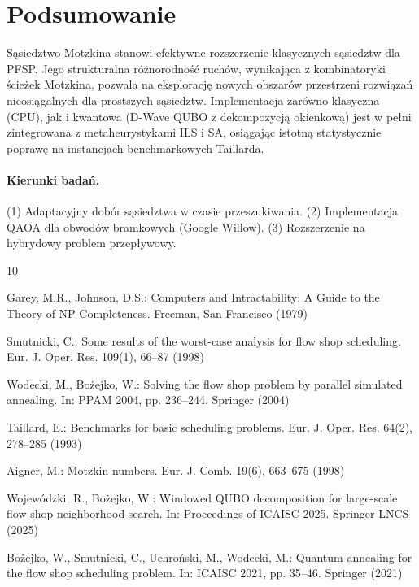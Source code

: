 \documentclass[12pt,a4paper]{article}
\begin{document}
\section{Podsumowanie}

Sąsiedztwo Motzkina stanowi efektywne rozszerzenie klasycznych sąsiedztw dla PFSP. Jego strukturalna różnorodność ruchów, wynikająca z kombinatoryki ścieżek Motzkina, pozwala na eksplorację nowych obszarów przestrzeni rozwiązań nieosiągalnych dla prostszych sąsiedztw. Implementacja zarówno klasyczna (CPU), jak i kwantowa (D-Wave QUBO z dekompozycją okienkową) jest w pełni zintegrowana z metaheurystykami ILS i SA, osiągając istotną statystycznie poprawę na instancjach benchmarkowych Taillarda.

\paragraph{Kierunki badań.}
(1) Adaptacyjny dobór sąsiedztwa w czasie przeszukiwania. (2) Implementacja QAOA dla obwodów bramkowych (Google Willow). (3) Rozszerzenie na hybrydowy problem przepływowy.

\begin{thebibliography}{10}

Garey, M.R., Johnson, D.S.: Computers and Intractability: A Guide to the Theory of NP-Completeness. Freeman, San Francisco (1979)

Smutnicki, C.: Some results of the worst-case analysis for flow shop scheduling. Eur. J. Oper. Res. 109(1), 66--87 (1998)

Wodecki, M., Bożejko, W.: Solving the flow shop problem by parallel simulated annealing. In: PPAM 2004, pp. 236--244. Springer (2004)

Taillard, E.: Benchmarks for basic scheduling problems. Eur. J. Oper. Res. 64(2), 278--285 (1993)

Aigner, M.: Motzkin numbers. Eur. J. Comb. 19(6), 663--675 (1998)

Wojewódzki, R., Bożejko, W.: Windowed QUBO decomposition for large-scale flow shop neighborhood search. In: Proceedings of ICAISC 2025. Springer LNCS (2025)

Bożejko, W., Smutnicki, C., Uchroński, M., Wodecki, M.: Quantum annealing for the flow shop scheduling problem. In: ICAISC 2021, pp. 35--46. Springer (2021)

\end{thebibliography}
\end{document}
